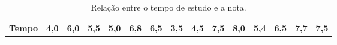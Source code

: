 \documentclass[12pt,brazil,]{book}
\begin{document}
\begin{longtable}[]{@{}lllllllllllllll@{}}
\caption{\label{tab:reg1}Relação entre o tempo de estudo e a
nota.}\tabularnewline
\toprule
\begin{minipage}[b]{0.10\columnwidth}\raggedright
\textbf{Tempo}\strut
\end{minipage} & \begin{minipage}[b]{0.04\columnwidth}\raggedright
4,0\strut
\end{minipage} & \begin{minipage}[b]{0.04\columnwidth}\raggedright
6,0\strut
\end{minipage} & \begin{minipage}[b]{0.04\columnwidth}\raggedright
5,5\strut
\end{minipage} & \begin{minipage}[b]{0.04\columnwidth}\raggedright
5,0\strut
\end{minipage} & \begin{minipage}[b]{0.04\columnwidth}\raggedright
6,8\strut
\end{minipage} & \begin{minipage}[b]{0.04\columnwidth}\raggedright
6,5\strut
\end{minipage} & \begin{minipage}[b]{0.04\columnwidth}\raggedright
3,5\strut
\end{minipage} & \begin{minipage}[b]{0.04\columnwidth}\raggedright
4,5\strut
\end{minipage} & \begin{minipage}[b]{0.04\columnwidth}\raggedright
7,5\strut
\end{minipage} & \begin{minipage}[b]{0.04\columnwidth}\raggedright
8,0\strut
\end{minipage} & \begin{minipage}[b]{0.04\columnwidth}\raggedright
5,4\strut
\end{minipage} & \begin{minipage}[b]{0.04\columnwidth}\raggedright
6,5\strut
\end{minipage} & \begin{minipage}[b]{0.04\columnwidth}\raggedright
7,7\strut
\end{minipage} & \begin{minipage}[b]{0.04\columnwidth}\raggedright
7,5\strut
\end{minipage}\tabularnewline
\midrule
\endfirsthead
\toprule
\begin{minipage}[b]{0.10\columnwidth}\raggedright

\end{minipage}
\end{longtable}
\end{document}
